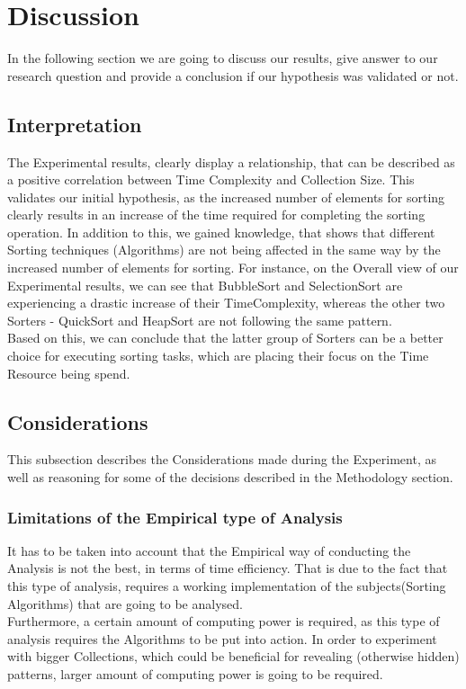 \documentclass[]{report}
\begin{document}
	\section{Discussion}
	In the following section we are going to discuss our results, give answer to our research question and provide a conclusion if our hypothesis was validated or not.
\subsection{Interpretation}
The Experimental results, clearly display a relationship, that can be described as a  positive correlation between Time Complexity and Collection Size. This validates our initial hypothesis, as the increased number of elements for sorting clearly results in an increase of the time required for completing the sorting operation. In addition to this, we gained knowledge, that shows that different Sorting techniques (Algorithms) are not being affected in the same way by the increased number of elements for sorting. For instance, on the Overall view of our Experimental results, we can see that BubbleSort and SelectionSort are experiencing a drastic increase of their TimeComplexity, whereas the other two Sorters - QuickSort and HeapSort are not following the same pattern.\\
Based on this, we can conclude that the latter group of Sorters can be a better choice for executing sorting tasks, which are placing their focus on the Time Resource being spend.
\subsection{Considerations}
This subsection describes the Considerations made during the Experiment, as well as reasoning for some of the decisions described in the Methodology section.
\subsubsection{Limitations of the Empirical type of Analysis}
It has to be taken into account that the Empirical way of conducting the Analysis is not the best, in terms of time efficiency. That is due to the fact that this type of analysis, requires a working implementation of the subjects(Sorting Algorithms) that are going to be analysed. \\
Furthermore, a certain amount of computing power is required, as this type of analysis requires the Algorithms to be put into action. In order to experiment with bigger Collections, which could be beneficial for revealing (otherwise hidden) patterns, larger amount of computing power is going to be required. 
\end{document}
